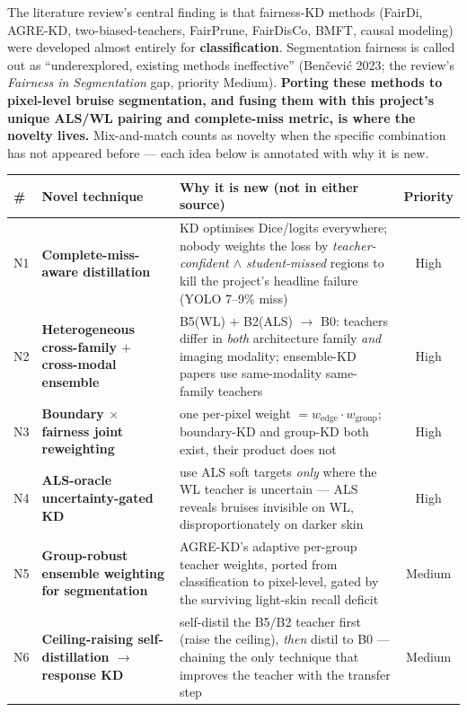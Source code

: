 \documentclass[11pt]{article}
\newcommand{\novel}[1]{\textcolor{noveltygreen}{\textbf{#1}}}
\begin{document}
The literature review's central finding is that fairness-KD methods
(FairDi, AGRE-KD, two-biased-teachers, FairPrune, FairDisCo, BMFT, causal modeling)
were developed almost entirely for \textbf{classification}. Segmentation fairness is called out
as ``underexplored, existing methods ineffective'' (Ben\v{c}evi\'c 2023; the review's
\emph{Fairness in Segmentation} gap, priority Medium). \novel{Porting these methods to
pixel-level bruise segmentation, and fusing them with this project's unique
ALS/WL pairing and complete-miss metric, is where the novelty lives.} Mix-and-match counts as
novelty when the specific combination has not appeared before --- each idea below is annotated
with why it is new.

\begin{center}
\small
\begin{longtable}{@{}p{0.4cm} P{5.3cm} P{5.5cm} c@{}}
\toprule
\# & Novel technique & Why it is new (not in either source) & Priority \\
\midrule
\endhead
N1 & \novel{Complete-miss-aware distillation} & KD optimises Dice/logits everywhere; nobody weights the loss by \emph{teacher-confident $\wedge$ student-missed} regions to kill the project's headline failure (YOLO 7--9\% miss) & High \\
N2 & \novel{Heterogeneous cross-family $+$ cross-modal ensemble} & B5(WL) $+$ B2(ALS) $\to$ B0: teachers differ in \emph{both} architecture family \emph{and} imaging modality; ensemble-KD papers use same-modality same-family teachers & High \\
N3 & \novel{Boundary $\times$ fairness joint reweighting} & one per-pixel weight $= w_{\text{edge}}\!\cdot w_{\text{group}}$; boundary-KD and group-KD both exist, their product does not & High \\
N4 & \novel{ALS-oracle uncertainty-gated KD} & use ALS soft targets \emph{only} where the WL teacher is uncertain --- ALS reveals bruises invisible on WL, disproportionately on darker skin & High \\
N5 & \novel{Group-robust ensemble weighting for segmentation} & AGRE-KD's adaptive per-group teacher weights, ported from classification to pixel-level, gated by the surviving light-skin recall deficit & Medium \\
N6 & \novel{Ceiling-raising self-distillation $\to$ response KD} & self-distil the B5/B2 teacher first (raise the ceiling), \emph{then} distil to B0 --- chaining the only technique that improves the teacher with the transfer step & Medium \\

\end{longtable}
\end{center}
\end{document}
